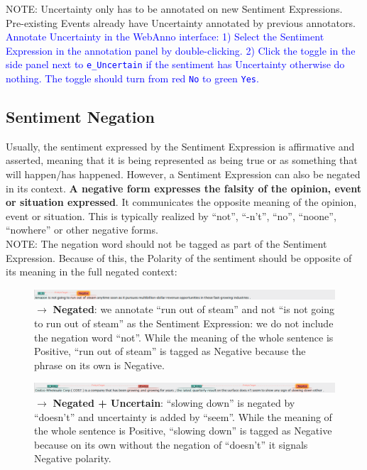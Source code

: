 \noindent
\textcolor{BrickRed}{NOTE: Uncertainty only has to be annotated on new Sentiment Expressions. Pre-existing Events already have Uncertainty annotated by previous annotators.}\\
\noindent
\textcolor{Blue}{Annotate Uncertainty in the WebAnno interface:
1) Select the Sentiment Expression in the annotation panel by double-clicking.
2) Click the toggle in the side panel next to \texttt{e\_Uncertain} if the sentiment has Uncertainty otherwise do nothing. The toggle should turn from red \texttt{No} to green \texttt{Yes}.}

\subsection{Sentiment Negation}
\label{sec:negationdefinition}

Usually, the sentiment expressed by the Sentiment Expression is affirmative and asserted, meaning that it is being represented as being true or as something that will happen/has happened.
However, a Sentiment Expression can also be negated in its context.
\textbf{A negative form expresses the falsity of the opinion, event or situation expressed}.
It communicates the opposite meaning of the opinion, event or situation.
This is typically realized by ``not'', ``-n't'', ``no'', ``noone'', ``nowhere'' or other negative forms.\\

\noindent
\textcolor{BrickRed}{NOTE: The negation word should not be tagged as part of the Sentiment Expression.
Because of this, the Polarity of the sentiment should be opposite of its meaning in the full negated context:}\\

\begin{figure}[h]
    \centering
    \includegraphics[width=\textwidth]{img/amzn04s34 negated negative sentiment.png}
    \caption*{$\rightarrow$ \textbf{Negated}: we annotate ``run out of steam'' and not ``is not going to run out of steam'' as the Sentiment Expression: we do not include the negation word ``not''. While the meaning of the whole sentence is Positive, ``run out of steam'' is tagged as Negative because the phrase on its own is Negative.}
    \label{fig:my_label}
\end{figure}

\begin{figure}[h]
    \centering
    \includegraphics[width=\textwidth]{img/cost02s02 new sentiment negative uncertain.png}
    \caption*{$\rightarrow$ \textbf{Negated + Uncertain}: ``slowing down'' is negated by ``doesn't'' and uncertainty is added by ``seem''. While the meaning of the whole sentence is Positive, ``slowing down'' is tagged as Negative because on its own without the negation of ``doesn't'' it signals Negative polarity.}
    \label{fig:my_label}
\end{figure}

